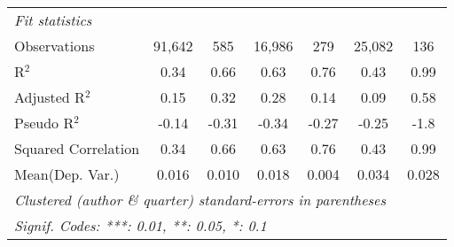 \begin{tabular}{lcccccc}
   \midrule
   \emph{Fit statistics}\\
   Observations                                               & 91,642       & 585          & 16,986  & 279            & 25,082  & 136\\  
   R$^2$                                                      & 0.34         & 0.66         & 0.63    & 0.76           & 0.43    & 0.99\\  
   Adjusted R$^2$                                             & 0.15         & 0.32         & 0.28    & 0.14           & 0.09    & 0.58\\  
   Pseudo R$^2$                                               & -0.14        & -0.31        & -0.34   & -0.27          & -0.25   & -1.8\\  
   Squared Correlation                                        & 0.34         & 0.66         & 0.63    & 0.76           & 0.43    & 0.99\\  
Mean(Dep. Var.) & 0.016 & 0.010 & 0.018 & 0.004 & 0.034 & 0.028 \\
   \midrule \midrule
   \multicolumn{7}{l}{\emph{Clustered (author \& quarter) standard-errors in parentheses}}\\
   \multicolumn{7}{l}{\emph{Signif. Codes: ***: 0.01, **: 0.05, *: 0.1}}\\
\end{tabular}
\par\endgroup
